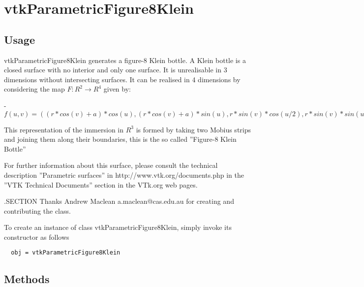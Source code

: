 \section{vtkParametricFigure8Klein}

\subsection{Usage}

 vtkParametricFigure8Klein generates a figure-8 Klein bottle.  A Klein bottle
 is a closed surface with no interior and only one surface.  It is
 unrealisable in 3 dimensions without intersecting surfaces.  It can be
 realised in 4 dimensions by considering the map $F:R^2 \rightarrow R^4$  given by:

 - $f(u,v) = ((r*cos(v)+a)*cos(u),(r*cos(v)+a)*sin(u),r*sin(v)*cos(u/2),r*sin(v)*sin(u/2))$

 This representation of the immersion in $R^3$ is formed by taking two Mobius
 strips and joining them along their boundaries, this is the so called
 ''Figure-8 Klein Bottle''

 For further information about this surface, please consult the 
 technical description ''Parametric surfaces'' in http://www.vtk.org/documents.php 
 in the ''VTK Technical Documents'' section in the VTk.org web pages.

 .SECTION Thanks
 Andrew Maclean a.maclean@cas.edu.au for creating and contributing the
 class.


To create an instance of class vtkParametricFigure8Klein, simply
invoke its constructor as follows
\begin{verbatim}
  obj = vtkParametricFigure8Klein
\end{verbatim}
\subsection{Methods}

